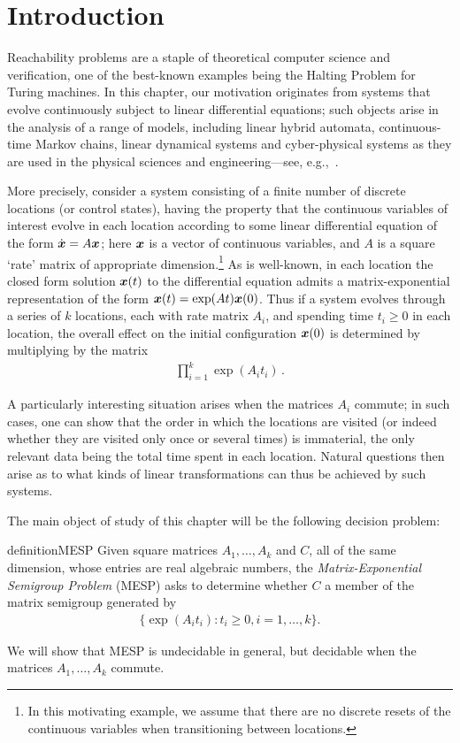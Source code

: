 \section{Introduction}

Reachability problems are a staple of theoretical computer
science and verification, one of the best-known examples being the
Halting Problem for Turing machines. In this chapter, our motivation
originates from systems that evolve continuously subject to linear
differential equations; such objects arise in the analysis of a range
of models, including linear hybrid automata, continuous-time Markov
chains, linear dynamical systems and cyber-physical systems as they
are used in the physical sciences and engineering---see,
e.g.,~\cite{Alu15}.

More precisely, consider a system consisting of a finite number of
discrete locations (or control states), having the property that the
continuous variables of interest evolve in each location according to
some linear differential equation of the form $\dot{\boldsymbol{x}} = A
\boldsymbol{x}$; here $\boldsymbol{x}$ is a vector of continuous
variables, and $A$ is a square `rate' matrix of appropriate
dimension.\footnote{In
  this motivating example, we assume that there are no discrete
  resets of the continuous variables when transitioning between
  locations.}
As is well-known, in each location the closed form solution
$\boldsymbol{x}(t)$ to the differential equation admits a
matrix-exponential representation of the form $\boldsymbol{x}(t) =
\exp(At)\boldsymbol{x}(0)$. Thus if a system evolves through a series
of $k$ locations, each with rate matrix $A_i$, and spending time $t_i
\geq 0$ in each location, the overall effect on the initial
configuration $\boldsymbol{x}(0)$ is determined by multiplying by the matrix
\begin{align*}
\prod \limits_{i=1}^{k} \exp(A_{i} t_{i}) \, .
\end{align*}

A particularly interesting situation arises when the matrices $A_i$
commute; in such cases, one can show that the order in which the
locations are visited (or indeed whether they are visited only once or
several times) is immaterial, the only relevant data being the total
time spent in each location. Natural questions then arise as to what
kinds of linear transformations can thus be achieved by such systems.

The main object of study of this chapter will be the following decision problem:
\begin{restatable}{definition}{MESP}
\label{def:MESP}
Given square matrices $A_{1}, \ldots, A_{k}$ and $C$, all of the same
dimension, whose entries are real algebraic numbers, the
\emph{Matrix-Exponential Semigroup Problem} (MESP) asks to determine
whether $C$ a member of the matrix semigroup generated by
\begin{align*}
\lbrace \exp(A_{i} t_{i}) : t_{i} \geq 0 , i=1,\ldots,k \rbrace.
\end{align*}
\end{restatable}
We will show that MESP is undecidable in general, but decidable when the matrices $A_{1}, \ldots, A_{k}$ commute.


